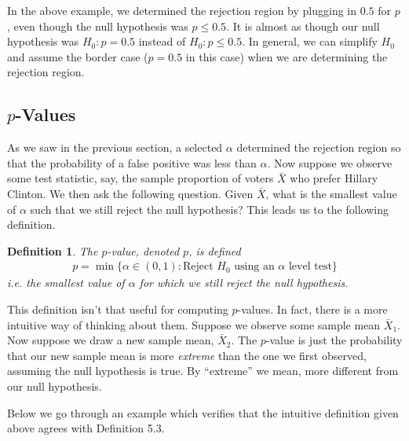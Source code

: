 \documentclass[11pt,letterpaper]{article}
\numberwithin{theorem}{section}
\newtheorem{definition}[theorem]{Definition}
\numberwithin{definition}{section}
\numberwithin{lemma}{section}
\numberwithin{corollary}{section}
\numberwithin{proposition}{section}
\theoremstyle{definition}
\numberwithin{remark}{section}
\numberwithin{claim}{section}
\numberwithin{observation}{section}
\numberwithin{fact}{section}
\numberwithin{assumption}{section}
\numberwithin{example}{section}
\numberwithin{exercise}{section}
\begin{document}
In the above example, we determined the rejection region by plugging in $0.5$ for $p$, even though the null hypothesis was $p \leq 0.5$. It is almost as though our null hypothesis was $H_0 : p = 0.5$ instead of $H_0 : p \leq 0.5$. In general, we can simplify $H_0$ and assume the border case ($p = 0.5$ in this case) when we are determining the rejection region.

\newpage
\subsection{$p$-Values}
As we saw in the previous section, a selected $\alpha$ determined the rejection region so that the probability of a false positive was less than $\alpha$. Now suppose we observe some test statistic, say, the sample proportion of voters $\bar{X}$ who prefer Hillary Clinton. We then ask the following question. Given $\bar{X}$, what is the smallest value of $\alpha$ such that we still reject the null hypothesis? This leads us to the following definition.

\begin{definition}
The $p$-value, denoted $p$, is defined
\begin{align*}
p = \min \{\alpha \in (0,1): \text{Reject $H_0$ using an $\alpha$ level test}\}
\end{align*}
i.e. the smallest value of $\alpha$ for which we still reject the null hypothesis.
\end{definition}

This definition isn't that useful for computing $p$-values. In fact, there is a more intuitive way of thinking about them. Suppose we observe some sample mean $\bar{X}_1$. Now suppose we draw a new sample mean, $\bar{X}_2$. The $p$-value is just the probability that our new sample mean is more \textit{extreme} than the one we first observed, assuming the null hypothesis is true. By ``extreme'' we mean, more different from our null hypothesis.

Below we go through an example which verifies that the intuitive definition given above agrees with Definition 5.3.
\end{document}
